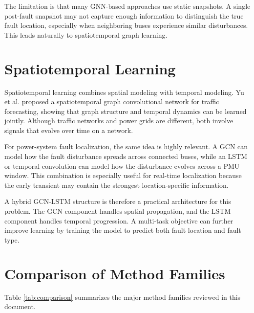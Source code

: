 \documentclass[12pt,a4paper]{article}
\begin{document}
The limitation is that many GNN-based approaches use static snapshots. A single post-fault snapshot may not capture enough information to distinguish the true fault location, especially when neighboring buses experience similar disturbances. This leads naturally to spatiotemporal graph learning.

\section{Spatiotemporal Learning}

Spatiotemporal learning combines spatial modeling with temporal modeling. Yu et al. \cite{yu2018} proposed a spatiotemporal graph convolutional network for traffic forecasting, showing that graph structure and temporal dynamics can be learned jointly. Although traffic networks and power grids are different, both involve signals that evolve over time on a network.

For power-system fault localization, the same idea is highly relevant. A GCN can model how the fault disturbance spreads across connected buses, while an LSTM or temporal convolution can model how the disturbance evolves across a PMU window. This combination is especially useful for real-time localization because the early transient may contain the strongest location-specific information.

A hybrid GCN-LSTM structure is therefore a practical architecture for this problem. The GCN component handles spatial propagation, and the LSTM component handles temporal progression. A multi-task objective can further improve learning by training the model to predict both fault location and fault type.

\section{Comparison of Method Families}

Table \ref{tab:comparison} summarizes the major method families reviewed in this document.
\end{document}
